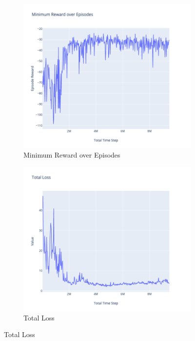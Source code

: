 \begin{figure}[!htb]
	\begin{subfigure}[!htb]{0.35\textwidth}
		\centering
		\includegraphics[width=\textwidth]{figures/exps/1st_exp/min_eps_reward}
		\caption{Minimum Reward over Episodes}
		\label{fig:min_eps_reward}
	\end{subfigure}
	\hfill
    \begin{subfigure}[!htb]{0.35\textwidth}
		\centering
		\includegraphics[width=\textwidth]{figures/exps/1st_exp/total_loss}
		\caption{Total Loss}
		\label{fig:total_loss}
	\end{subfigure}
    \hfill
    

\end{figure}
